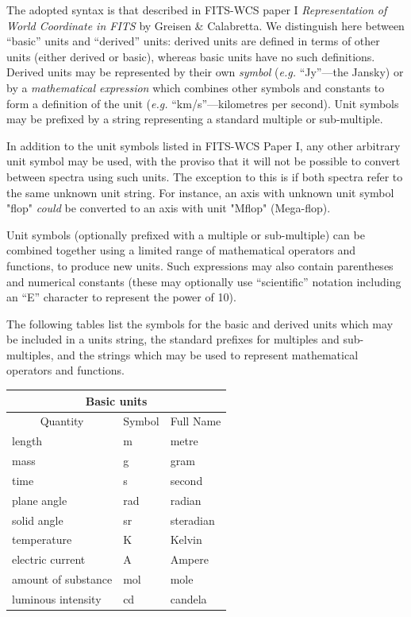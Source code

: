 \documentclass[twoside,11pt]{article}
\renewcommand{\_}{\texttt{\symbol{95}}}
\begin{document}
The adopted syntax is that described in FITS-WCS paper I \textit{Representation
of World Coordinate in FITS} by Greisen \& Calabretta. We distinguish
here between ``basic'' units and ``derived'' units: derived units are
defined in terms of other units (either derived or basic), whereas basic
units have no such definitions. Derived units may be represented by their
own \emph{symbol} (\emph{e.g.} ``Jy''---the Jansky) or by a
\emph{mathematical expression} which combines other symbols and constants
to form a definition of the unit (\emph{e.g.} ``km/s''---kilometres per
second). Unit symbols may be prefixed by a string representing a standard
multiple or sub-multiple.

In addition to the unit symbols listed in FITS-WCS Paper I, any other
arbitrary unit symbol may be used, with the proviso that it will not be
possible to convert between spectra using such units. The exception to
this is if both spectra refer to the same unknown unit string. For instance,
an axis with unknown unit symbol "flop" \emph{could} be converted to an axis
with unit "Mflop" (Mega-flop).

Unit symbols (optionally prefixed with a multiple or sub-multiple) can be
combined together using a limited range of mathematical operators and
functions, to produce new units. Such expressions may also contain
parentheses and numerical constants (these may optionally use
``scientific'' notation including an ``E'' character to represent the
power of 10).

The following tables list the symbols for the basic and derived units which
may be included in a units string, the standard prefixes for multiples
and sub-multiples, and the strings which may be used to represent
mathematical operators and functions.

\begin{center}
\begin{tabular}{|l|l|l|}
\hline
\multicolumn{3}{|c|}{{\large Basic units}} \\ \hline
\multicolumn{1}{|c|}{Quantity} & \multicolumn{1}{|c|}{Symbol} &
\multicolumn{1}{c|}{Full Name} \\ \hline
length              & m   & metre \\
mass                & g   & gram \\
time                & s   & second \\
plane angle         & rad & radian \\
solid angle         & sr  & steradian \\
temperature         & K   & Kelvin \\
electric current    & A   & Ampere \\
amount of substance & mol & mole \\
luminous intensity  & cd  & candela \\
\hline
\end{tabular}
\end{center}
\end{document}
